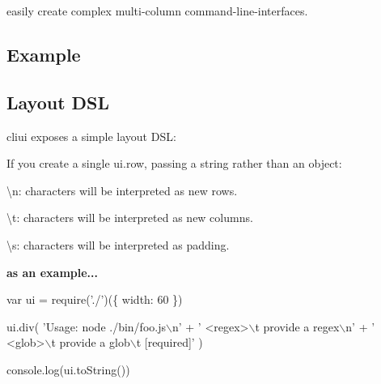 \href{https://travis-ci.org/yargs/cliui}{\tt } \href{https://coveralls.io/r/yargs/cliui?branch=}{\tt } \href{https://www.npmjs.com/package/cliui}{\tt } \href{https://github.com/conventional-changelog/standard-version}{\tt }

easily create complex multi-\/column command-\/line-\/interfaces.

\subsection*{Example}






\subsection*{Layout D\+SL}

cliui exposes a simple layout D\+SL\+:

If you create a single {\ttfamily ui.\+row}, passing a string rather than an object\+:


\begin{DoxyItemize}
\item {\ttfamily \textbackslash{}n}\+: characters will be interpreted as new rows.
\item {\ttfamily \textbackslash{}t}\+: characters will be interpreted as new columns.
\item {\ttfamily \textbackslash{}s}\+: characters will be interpreted as padding.
\end{DoxyItemize}

{\bfseries as an example...}


\begin{DoxyCode}
var ui = require('./')(\{
  width: 60
\})

ui.div(
  'Usage: node ./bin/foo.js\(\backslash\)n' +
  '  <regex>\(\backslash\)t  provide a regex\(\backslash\)n' +
  '  <glob>\(\backslash\)t  provide a glob\(\backslash\)t [required]'
)

console.log(ui.toString())
\end{DoxyCode}


